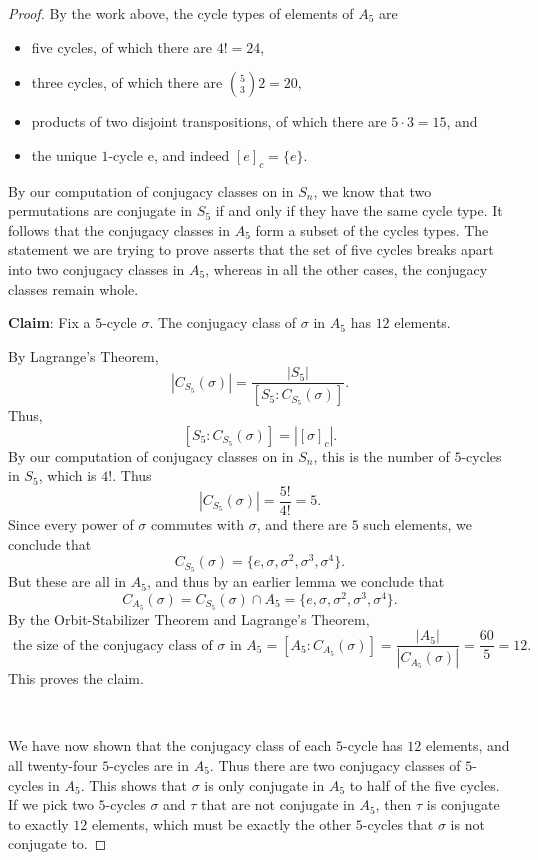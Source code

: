 \documentclass[12pt]{report}
\numberwithin{equation}{section}
\numberwithin{theorem}{chapter}
\theoremstyle{definition}
\newtheorem*{basic properties}{Basic Properties}
\newtheorem*{Important Remark}{Important Remark}
\newcommand{\s}{\sigma}
\begin{document}
\begin{proof}
By the work above, the cycle types of elements of $A_5$ are
\begin{itemize}[itemsep=-0.1em]
\item five cycles, of which there are $4! = 24$, 
\item three cycles, of which there are ${5 \choose 3} 2 =   20$,
\item products of two disjoint transpositions, of which there are $5 \cdot 3 = 15$, and
\item the unique $1$-cycle e, and indeed $[e]_c = \{e\}$.
\end{itemize}

By our computation of conjugacy classes on in $S_n$, we know that two permutations are conjugate in $S_5$ if and only if they have the same cycle type. It follows that the conjugacy classes in $A_5$ form a subset of the cycles types.
The statement we are trying to prove asserts that the set of five cycles breaks apart into two conjugacy classes in $A_5$, whereas in all the other cases, the conjugacy classes remain whole. 



{\bf Claim}: Fix a $5$-cycle $\sigma$. The conjugacy class of $\sigma$ in $A_5$ has $12$ elements.



By Lagrange's Theorem,
$$|C_{S_5}(\sigma)| = \frac{|S_5|}{[S_5 : C_{S_5}(\sigma)]}.$$
Thus, 
$$[S_5 : C_{S_5}(\sigma)] = |[\sigma]_c|.$$
By our computation of conjugacy classes on in $S_n$, this is the number of $5$-cycles in $S_5$, which is $4!$.
Thus
$$|C_{S_5}(\sigma)| = \frac{5!}{4!} = 5.$$
Since every power of $\sigma$ commutes with $\sigma$, and there are $5$ such elements, we conclude that
$$C_{S_5}(\sigma) = \{e, \sigma, \sigma^2, \sigma^3, \sigma^4\}.$$
But these are all in $A_5$, and thus by an earlier lemma we conclude that
$$C_{A_5}(\sigma) = C_{S_5}(\sigma) \cap A_5 = \{e, \sigma, \sigma^2, \sigma^3, \s^4\}.$$
By the Orbit-Stabilizer Theorem and Lagrange's Theorem, 
$$\text{ the size of the conjugacy class of $\sigma$ in $A_5$} = [A_5: C_{A_5}(\sigma)] = \frac{|A_5|}{|C_{A_5}(\sigma)|} = \frac{60}{5} = 12.$$
This proves the claim.


\

We have now shown that the conjugacy class of each $5$-cycle has $12$ elements, and all twenty-four $5$-cycles are in $A_5$. Thus there are two conjugacy classes of $5$-cycles in $A_5$.
This shows that $\sigma$ is only conjugate in $A_5$ to half of the five cycles. 
If we pick two $5$-cycles $\sigma$ and $\tau$ that are not conjugate in $A_5$, then $\tau$ is conjugate to exactly $12$ elements, which must be exactly the other $5$-cycles that $\sigma$ is not conjugate to. 



\end{proof}
\end{document}
